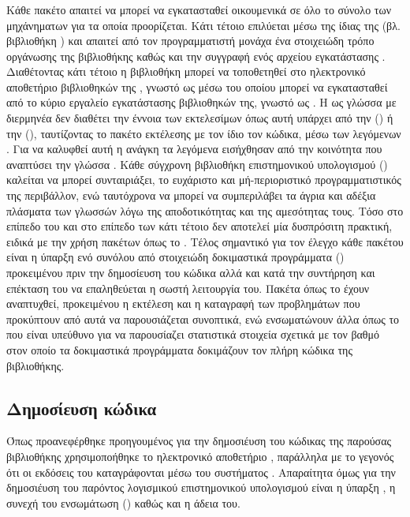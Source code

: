 \subsubsection{}
Κάθε πακέτο  απαιτεί να μπορεί να εγκατασταθεί οικουμενικά σε όλο το σύνολο των μηχάνηματων για τα οποία προορίζεται.
Κάτι τέτοιο επιλύεται μέσω της ίδιας της  (βλ. βιβλιοθήκη \href{https://pypi.org/project/setuptools/}{}) και απαιτεί από τον προγραμματιστή μονάχα ένα στοιχειώδη τρόπο οργάνωσης της βιβλιοθήκης καθώς και την συγγραφή ενός αρχείου εγκατάστασης .
Διαθέτοντας κάτι τέτοιο η βιβλιοθήκη μπορεί να τοποθετηθεί στο ηλεκτρονικό αποθετήριο βιβλιοθηκών της , γνωστό ως  μέσω του οποίου μπορεί να εγκατασταθεί από το κύριο εργαλείο εγκατάστασης βιβλιοθηκών της, γνωστό ως \href{https://pypi.org/project/pip/}{}.
Η  ως γλώσσα με διερμηνέα δεν διαθέτει την έννοια των εκτελεσίμων όπως αυτή υπάρχει από την  () ή την  (), ταυτίζοντας το πακέτο εκτέλεσης με τον ίδιο τον κώδικα, μέσω των λεγόμενων .
Για να καλυφθεί αυτή η ανάγκη τα λεγόμενα  εισήχθησαν από την κοινότητα που αναπτύσει την γλώσσα .
Κάθε σύγχρονη βιβλιοθήκη επιστημονικού υπολογισμού () καλείται να μπορεί συνταιριάξει, το ευχάριστο και μή-περιοριστικό προγραμματιστικός της περιβάλλον, ενώ ταυτόχρονα να μπορεί να συμπεριλάβει τα άγρια και αδέξια πλάσματα των γλωσσών  λόγω της αποδοτικότητας και της αμεσότητας τους.
Τόσο στο επίπεδο του  και στο επίπεδο των  κάτι τέτοιο δεν αποτελεί μία δυσπρόσιτη πρακτική, ειδικά με την χρήση πακέτων όπως το \href{https://pypi.org/project/Cython/}{}.
Τέλος σημαντικό για τον έλεγχο κάθε πακέτου είναι η ύπαρξη ενό συνόλου από στοιχειώδη δοκιμαστικά προγράμματα () προκειμένου πριν την δημοσίευση του κώδικα αλλά και κατά την συντήρηση και επέκταση του να επαληθεύεται η σωστή λειτουργία του.
Πακέτα όπως το \href{https://pypi.org/project/nose/}{} έχουν αναπτυχθεί, προκειμένου η εκτέλεση και η καταγραφή των προβλημάτων που προκύπτουν από αυτά να παρουσιάζεται συνοπτικά, ενώ ενσωματώνουν άλλα όπως το \href{https://pypi.org/project/coverage/}{} που είναι υπεύθυνο για να παρουσίαζει στατιστικά στοιχεία σχετικά με τον βαθμό στον οποίο τα δοκιμαστικά προγράμματα δοκιμάζουν τον πλήρη κώδικα της βιβλιοθήκης.

\subsection{Δημοσίευση κώδικα}
Όπως προανεφέρθηκε προηγουμένος για την δημοσιέυση του κώδικας της παρούσας βιβλιοθήκης χρησιμοποήθηκε το ηλεκτρονικό αποθετήριο \href{https://github.com/ysig/GraKeL}{}, παράλληλα με το γεγονός ότι οι εκδόσεις του καταγράφονται μέσω του συστήματος .
Απαραίτητα όμως για την δημοσιέυση του παρόντος λογισμικού επιστημονικού υπολογισμού  είναι η ύπαρξη , η συνεχή του ενσωμάτωση () καθώς και η άδεια του.
